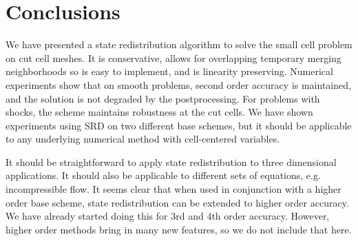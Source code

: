 \section{Conclusions}\label{sec:conc}
We have presented a  state redistribution algorithm to solve the small cell problem on cut cell meshes.  It is conservative, allows for overlapping temporary merging neighborhoods so is easy to implement, and is linearity preserving.   
Numerical experiments show that on smooth problems, second order accuracy is maintained, and the solution is not degraded by the postprocessing. For problems with shocks, the scheme maintains robustness at the cut cells.
We have shown experiments using SRD on two different base schemes, but it should be 
applicable to any underlying numerical method with
cell-centered variables.

It should be straightforward to apply state redistribution to
three dimensional applications.
It should also be applicable to 
different sets of equations, e.g. incompressible flow. 
It seems clear that 
when used in conjunction with a higher order base scheme, 
state redistribution can be extended to higher order accuracy. 
We have already started doing this for 
3rd and 4th order accuracy. However, higher order methods bring 
in many new features, so we do not include that here.
